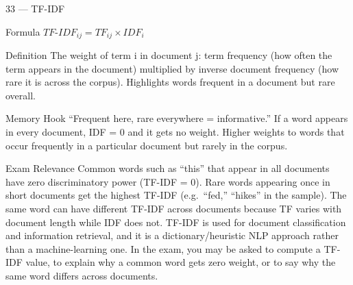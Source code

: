 \documentclass[aspectratio=169,8pt]{beamer}
\begin{document}
	\begin{frame}{33 --- TF-IDF}
		\begin{block}{Formula}
			$TF\text{-}IDF_{ij} = TF_{ij} \times IDF_i$
		\end{block}
		\begin{block}{Definition}
			The weight of term i in document j: term frequency (how often the term appears in the document) multiplied by inverse document frequency (how rare it is across the corpus). Highlights words frequent in a document but rare overall.
		\end{block}
		\begin{block}{Memory Hook}
			``Frequent here, rare everywhere = informative.'' If a word appears in every document, IDF = 0 and it gets no weight. Higher weights to words that occur frequently in a particular document but rarely in the corpus.
		\end{block}
		\begin{block}{Exam Relevance}
			Common words such as ``this'' that appear in all documents have zero discriminatory power (TF-IDF = 0). Rare words appearing once in short documents get the highest TF-IDF (e.g.\ ``fed,'' ``hikes'' in the sample). The same word can have different TF-IDF across documents because TF varies with document length while IDF does not. TF-IDF is used for document classification and information retrieval, and it is a dictionary/heuristic NLP approach rather than a machine-learning one. In the exam, you may be asked to compute a TF-IDF value, to explain why a common word gets zero weight, or to say why the same word differs across documents.
		\end{block}
	\end{frame}
	
\end{document}
